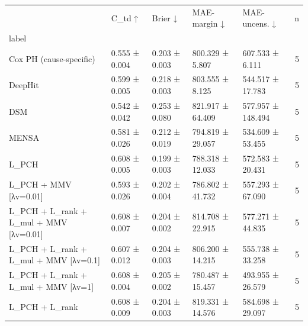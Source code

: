 \begin{tabular}{lllllr}
\toprule
 & C\_td ↑ & Brier ↓ & MAE-margin ↓ & MAE-uncens. ↓ & n \\
label &  &  &  &  &  \\
\midrule
Cox PH (cause-specific) & 0.555 ± 0.004 & 0.203 ± 0.003 & 800.329 ± 5.807 & 607.533 ± 6.111 & 5 \\
DeepHit & 0.599 ± 0.005 & 0.218 ± 0.003 & 803.555 ± 8.125 & 544.517 ± 17.783 & 5 \\
DSM & 0.542 ± 0.042 & 0.253 ± 0.080 & 821.917 ± 64.409 & 577.957 ± 148.494 & 5 \\
MENSA & 0.581 ± 0.026 & 0.212 ± 0.019 & 794.819 ± 29.057 & 534.609 ± 53.455 & 5 \\
L\_PCH & 0.608 ± 0.005 & 0.199 ± 0.003 & 788.318 ± 12.033 & 572.583 ± 20.431 & 5 \\
L\_PCH + MMV [λv=0.01] & 0.593 ± 0.026 & 0.202 ± 0.004 & 786.802 ± 41.732 & 557.293 ± 67.090 & 5 \\
L\_PCH + L\_rank + L\_mul + MMV [λv=0.01] & 0.608 ± 0.007 & 0.204 ± 0.002 & 814.708 ± 22.915 & 577.271 ± 44.835 & 5 \\
L\_PCH + L\_rank + L\_mul + MMV [λv=0.1] & 0.607 ± 0.012 & 0.204 ± 0.003 & 806.200 ± 14.215 & 555.738 ± 33.258 & 5 \\
L\_PCH + L\_rank + L\_mul + MMV [λv=1] & 0.608 ± 0.004 & 0.205 ± 0.002 & 780.487 ± 15.457 & 493.955 ± 26.579 & 5 \\
L\_PCH + L\_rank & 0.608 ± 0.009 & 0.204 ± 0.003 & 819.331 ± 14.576 & 584.698 ± 29.097 & 5 \\
\bottomrule
\end{tabular}
